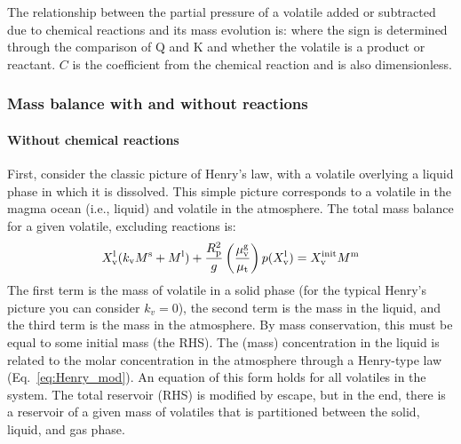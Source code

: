 The relationship between the partial pressure of a volatile added or subtracted due to chemical reactions and its mass evolution is: 
where the sign is determined through the comparison of Q and K and whether the volatile is a product or reactant. $C$ is the coefficient from the chemical reaction and is also dimensionless.  
\subsubsection{Mass balance with and without reactions}
\paragraph{Without chemical reactions}
First, consider the classic picture of Henry's law, with a volatile overlying a liquid phase in which it is dissolved.  This simple picture corresponds to a volatile in the magma ocean (i.e., liquid) and volatile in the atmosphere.  The total mass balance for a given volatile, excluding reactions is:
\begin{equation}
X_{\rm v}^{\rm l} (k_{\rm v} M^{\rm s} + M^{\rm l}) + \frac{R_{\rm p}^2}{g} \left( \frac{\mu_{\rm v}^{\rm g}}{\mu_{\rm t}} \right) p (X_{\rm v}^{\rm l}) = X_{\rm v}^{\rm init} M^{\rm m}
\end{equation}
The first term is the mass of volatile in a solid phase (for the typical Henry's picture you can consider $k_v=0$), the second term is the mass in the liquid, and the third term is the mass in the atmosphere.  By mass conservation, this must be equal to some initial mass (the RHS).  The (mass) concentration in the liquid is related to the molar concentration in the atmosphere through a Henry-type law (Eq.~\ref{eq:Henry_mod}).  An equation of this form holds for all volatiles in the system.  The total reservoir (RHS) is modified by escape, but in the end, there is a reservoir of a given mass of volatiles that is partitioned between the solid, liquid, and gas phase.

